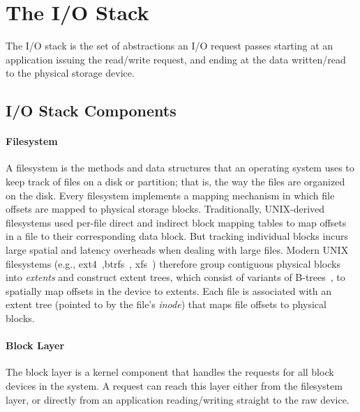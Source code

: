 \section{The I/O Stack}
The I/O stack is the set of abstractions an I/O request passes starting at an application
issuing the read/write request, and ending at the data written/read to the physical storage
device.

\subsection*{I/O Stack Components}
\paragraph{Filesystem}
A filesystem is the methods and data structures that an operating system uses to keep track of
files on a disk or partition; that is, the way the files are organized on the disk.
Every filesystem implements a mapping mechanism in which file offsets are mapped to physical
 storage blocks.
Traditionally, UNIX-derived filesystems used per-file direct and indirect  block mapping tables
to map offsets in a file to their corresponding data block. But tracking individual blocks
incurs large spatial and latency overheads when dealing with large files. 
Modern UNIX filesystems (e.g., ext4~\cite{mathur07ext4},btrfs~\cite{rodeh13btrfs},
 xfs~\cite{sweeney96xfs}) therefore group contiguous physical blocks
 into \emph{extents} and construct extent trees, which consist of variants of
 B-trees~\cite{comer79btree}, to spatially map offsets in the device to extents.
Each file is associated with an extent tree (pointed to by the file's \emph{inode}) that maps
 file offsets to physical blocks.

\paragraph{Block Layer}
The block layer is a kernel component that handles the requests for all block devices in the system.
A request can reach this layer either from the filesystem layer, or directly from an application reading/writing straight to the raw device.


